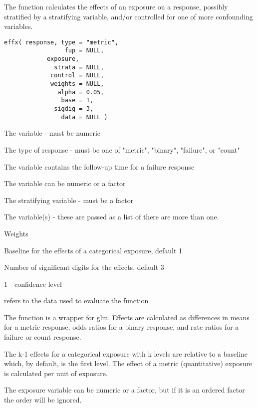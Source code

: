 \begin{Description}\relax
The function calculates the effects of an exposure on a response,
possibly stratified by a stratifying variable, and/or controlled for one
of more confounding variables.
\end{Description}
\begin{Usage}
\begin{verbatim}
effx( response, type = "metric",
                 fup = NULL,     
            exposure,     
              strata = NULL,  
             control = NULL,
             weights = NULL,
               alpha = 0.05,   
                base = 1,             
              sigdig = 3,     
                data = NULL )    
\end{verbatim}
\end{Usage}
\begin{Arguments}
\begin{ldescription}
\item[\code{response}] The  variable - must be numeric
\item[\code{type}] The type of response - must be one of "metric",
"binary", "failure", or "count"
\item[\code{fup}] The  variable contains the follow-up time for a
failure response
\item[\code{exposure}] The  variable can be numeric or a factor
\item[\code{strata}] The  stratifying variable - must be a factor
\item[\code{control}] The  variable(s) - these are passed as a
list of there are more than one.
\item[\code{weights}] Weights
\item[\code{base}] Baseline for the effects of a categorical exposure, default 1
\item[\code{sigdig}] Number of significant digits for the effects, default 3
\item[\code{alpha}] 1 - confidence level
\item[\code{data}]  refers to the data used to evaluate the function
\end{ldescription}
\end{Arguments}
\begin{Details}\relax
The function is a wrapper for glm. Effects are calculated as
differences in means for a metric response, odds ratios for a binary
response, and rate ratios for a failure or count response.  

The k-1 effects for a categorical exposure with k levels are relative
to a baseline which, by default, is the first level. The effect of a
metric (quantitative) exposure is calculated per unit of exposure. 

The exposure variable can be numeric or a factor, but if it is an
ordered factor the order will be ignored.
\end{Details}
